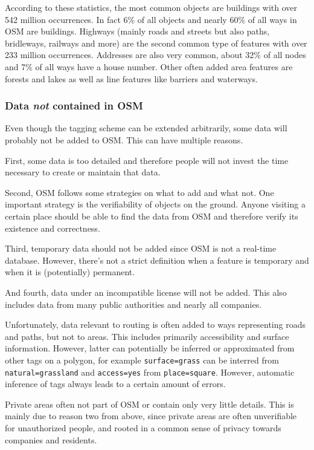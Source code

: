 			According to these statistics, the most common objects are buildings with over 542 million occurrences.
			In fact 6\% of all objects and nearly 60\% of all ways in OSM are buildings.
			Highways (mainly roads and streets but also paths, bridleways, railways and more) are the second common type of features with over 233 million occurrences.
			Addresses are also very common, about 32\% of all nodes and 7\% of all ways have a house number.
			Other often added area features are forests and lakes as well as line features like barriers and waterways.
			
		\subsubsection{Data \textit{not} contained in OSM}
		
			Even though the tagging scheme can be extended arbitrarily, some data will probably not be added to OSM.
			This can have multiple reasons.
			
			First, some data is too detailed and therefore people will not invest the time necessary to create or maintain that data.
			
			Second, OSM follows some strategies on what to add and what not.
			One important strategy is the verifiability of objects on the ground.
			Anyone visiting a certain place should be able to find the data from OSM and therefore verify its existence and correctness.
			
			Third, temporary data should not be added since OSM is not a real-time database.
			However, there's not a strict definition when a feature is temporary and when it is (potentially) permanent.
			
			And fourth, data under an incompatible license will not be added.
			This also includes data from many public authorities and nearly all companies.
			
			Unfortunately, data relevant to routing is often added to ways representing roads and paths, but not to areas.
			This includes primarily accessibility and surface information.
			However, latter can potentially be inferred or approximated from other tags on a polygon, for example \texttt{surface=grass} can be interred from \texttt{natural=grassland} and \texttt{access=yes} from \texttt{place=square}.
			However, automatic inference of tags always leads to a certain amount of errors.
			
			Private areas often not part of OSM or contain only very little details.
			This is mainly due to reason two from above, since private areas are often unverifiable for unauthorized people, and rooted in a common sense of privacy towards companies and residents.
			
